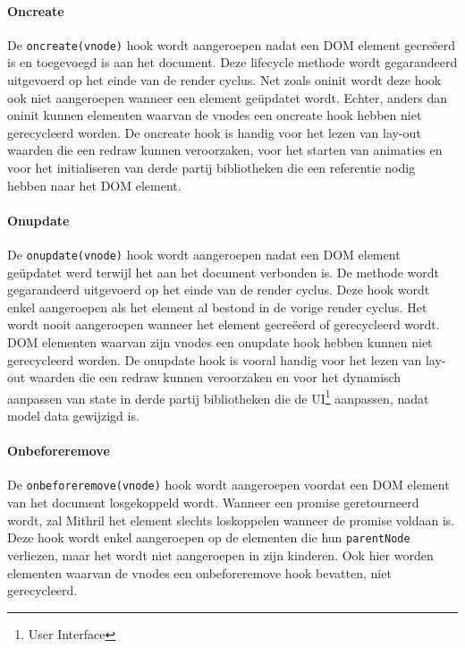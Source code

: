 \paragraph{Oncreate}

De \texttt{oncreate(vnode)} hook wordt aangeroepen nadat een DOM element gecreëerd is en toegevoegd is aan het document. Deze lifecycle methode wordt gegarandeerd uitgevoerd op het einde van de render cyclus. Net zoals oninit wordt deze hook ook niet aangeroepen wanneer een element geüpdatet wordt. Echter, anders dan oninit kunnen elementen waarvan de vnodes een oncreate hook hebben niet gerecycleerd worden. De oncreate hook is handig voor het lezen van lay-out waarden die een redraw kunnen veroorzaken, voor het starten van animaties en voor het initialiseren van derde partij bibliotheken die een referentie nodig hebben naar het DOM element. \autocite{Mithril2019e}

\paragraph{Onupdate}

De \texttt{onupdate(vnode)} hook wordt aangeroepen nadat een DOM element geüpdatet werd terwijl het aan het document verbonden is. De methode wordt gegarandeerd uitgevoerd op het einde van de render cyclus. Deze hook wordt enkel aangeroepen als het element al bestond in de vorige render cyclus. Het wordt nooit aangeroepen wanneer het element gecreëerd of gerecycleerd wordt. DOM elementen waarvan zijn vnodes een onupdate hook hebben kunnen niet gerecycleerd worden. De onupdate hook is vooral handig voor het lezen van lay-out waarden die een redraw kunnen veroorzaken en voor het dynamisch aanpassen van state in derde partij bibliotheken die de UI\footnote{User Interface} aanpassen, nadat model data gewijzigd is. \autocite{Mithril2019e}

\paragraph{Onbeforeremove}

De \texttt{onbeforeremove(vnode)} hook wordt aangeroepen voordat een DOM element van het document losgekoppeld wordt. Wanneer een promise geretourneerd wordt, zal Mithril het element slechts loskoppelen wanneer de promise voldaan is. Deze hook wordt enkel aangeroepen op de elementen die hun \texttt{parentNode} verliezen, maar het wordt niet aangeroepen in zijn kinderen. Ook hier worden elementen waarvan de vnodes een onbeforeremove hook bevatten, niet gerecycleerd. \autocite{Mithril2019e}

